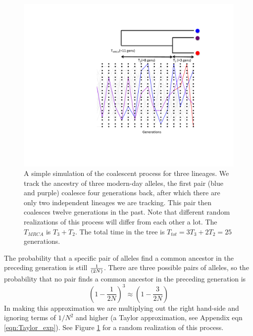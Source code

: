 \begin{figure}
\begin{center}
  \includegraphics[width = 0.75 \textwidth]{figures/Coalescent/Coal_three_lineages.pdf}
\end{center}
\caption{A simple simulation of the coalescent process for three
  lineages. We track the ancestry of
  three modern-day alleles, the first pair (blue and purple) coalesce four generations back, after which
  there are only two independent lineages we are tracking. This pair
  then coalesces twelve generations in the past. Note that different
  random realizations of this process will differ from each other a lot. The $T_{MRCA}$ is $T_3+T_2$. The total time in the tree is $T_{tot}=3T_3 + 2T_2= 25$ generations.  } \label{fig:Coalescent_simulation_3}
\end{figure}

The probability that a specific pair of alleles find a common ancestor in the
preceding generation is still $\nicefrac{1}{(2N)}$. There are three possible pairs of
alleles, so the probability that no pair finds a common ancestor in the preceding generation is
\begin{equation}
\left(1-\frac{1}{2N} \right)^3 \approx \left( 1- \frac{3}{2N} \right)
\end{equation}
In making this approximation we are multiplying out the right hand-side
and ignoring terms of $1/N^2$ and higher (a Taylor approximation, see Appendix eqn \eqref{eqn:Taylor_exp}).
 See Figure \ref{fig:Coalescent_simulation_3} for a random realization of this process. \\

